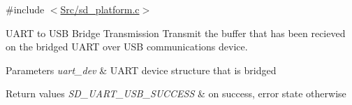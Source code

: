 {\ttfamily \#include $<$\mbox{\hyperlink{sd__platform_8c}{Src/sd\+\_\+platform.\+c}}$>$}



U\+A\+RT to U\+SB Bridge Transmission Transmit the buffer that has been recieved on the bridged U\+A\+RT over U\+SB communications device. 


\begin{DoxyParams}{Parameters}
{\em uart\+\_\+dev} & U\+A\+RT device structure that is bridged \\
\hline
\end{DoxyParams}

\begin{DoxyRetVals}{Return values}
{\em S\+D\+\_\+\+U\+A\+R\+T\+\_\+\+U\+S\+B\+\_\+\+S\+U\+C\+C\+E\+SS} & on success, error state otherwise \\
\hline
\end{DoxyRetVals}


